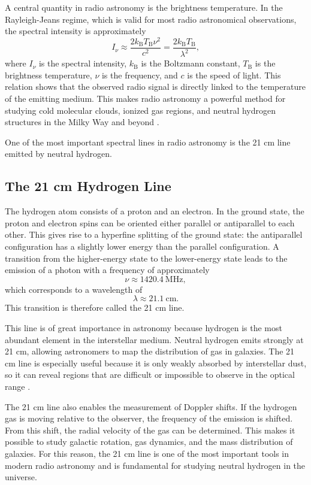 \documentclass[10pt,a4paper, bibliography=totoc]{scrartcl}
\begin{document}
A central quantity in radio astronomy is the brightness temperature. In the Rayleigh-Jeans regime, which is valid for most radio astronomical observations, the spectral intensity is approximately
\[
I_\nu \approx \frac{2k_\mathrm{B} T_\mathrm{B} \nu^2}{c^2} = \frac{2k_\mathrm{B} T_\mathrm{B}}{\lambda^2},
\] 
where $I_\nu$ is the spectral intensity, $k_\mathrm{B}$ is the Boltzmann constant, $T_\mathrm{B}$ is the brightness temperature, $\nu$ is the frequency, and $c$ is the speed of light. This relation shows that the observed radio signal is directly linked to the temperature of the emitting medium. This makes radio astronomy a powerful method for studying cold molecular clouds, ionized gas regions, and neutral hydrogen structures in the Milky Way and beyond \cite{0}.

One of the most important spectral lines in radio astronomy is the 21 cm line emitted by neutral hydrogen.

\subsection{The 21 cm Hydrogen Line}

The hydrogen atom consists of a proton and an electron. In the ground state, the proton and electron spins can be oriented either parallel or antiparallel to each other. This gives rise to a hyperfine splitting of the ground state: the antiparallel configuration has a slightly lower energy than the parallel configuration. A transition from the higher-energy state to the lower-energy state leads to the emission of a photon with a frequency of approximately
\[
\nu \approx 1420.4\ \mathrm{MHz},
\]
which corresponds to a wavelength of
\[
\lambda \approx 21.1\ \mathrm{cm}.
\]
This transition is therefore called the 21 cm line.

This line is of great importance in astronomy because hydrogen is the most abundant element in the interstellar medium. Neutral hydrogen emits strongly at 21 cm, allowing astronomers to map the distribution of gas in galaxies. The 21 cm line is especially useful because it is only weakly absorbed by interstellar dust, so it can reveal regions that are difficult or impossible to observe in the optical range \cite{0}.

The 21 cm line also enables the measurement of Doppler shifts. If the hydrogen gas is moving relative to the observer, the frequency of the emission is shifted. From this shift, the radial velocity of the gas can be determined. This makes it possible to study galactic rotation, gas dynamics, and the mass distribution of galaxies. For this reason, the 21 cm line is one of the most important tools in modern radio astronomy and is fundamental for studying neutral hydrogen in the universe.
\end{document}

